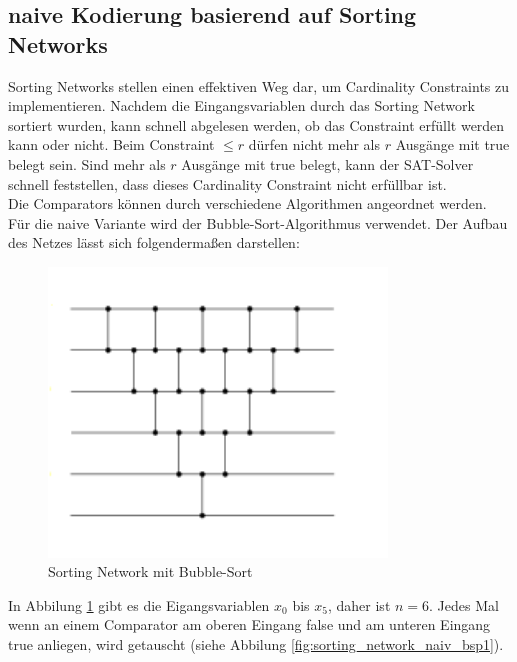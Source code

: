 \documentclass[a4,abstract=on]{scrartcl}
\begin{document}
	\subsection{naive Kodierung basierend auf Sorting Networks}
Sorting Networks stellen einen effektiven Weg dar, um Cardinality Constraints zu implementieren. Nachdem die Eingangsvariablen durch das Sorting Network sortiert wurden, kann schnell abgelesen werden, ob das Constraint erfüllt werden kann oder nicht.
Beim Constraint $\leq r$ dürfen nicht mehr als $r$ Ausgänge mit true belegt sein. Sind mehr als $r$ Ausgänge mit true belegt, kann der SAT-Solver schnell feststellen, dass dieses Cardinality Constraint nicht erfüllbar ist.\\
Die Comparators können durch verschiedene Algorithmen angeordnet werden. Für die naive Variante wird der Bubble-Sort-Algorithmus verwendet. Der Aufbau des Netzes lässt sich folgendermaßen darstellen:\\

\begin{figure}[H]
\centering
\includegraphics[width=9cm]{sorting_network_bubble.png}
\caption{Sorting Network mit Bubble-Sort}
\label{fig:sorting_network_naiv_bsp}
\end{figure}

In Abbilung \ref{fig:sorting_network_naiv_bsp} gibt es die Eigangsvariablen $x_0$ bis $x_5$, daher ist $n=6$. Jedes Mal wenn an einem Comparator am oberen Eingang false und am unteren Eingang true anliegen, wird getauscht (siehe Abbilung \ref{fig:sorting_network_naiv_bsp1}).
\end{document}
